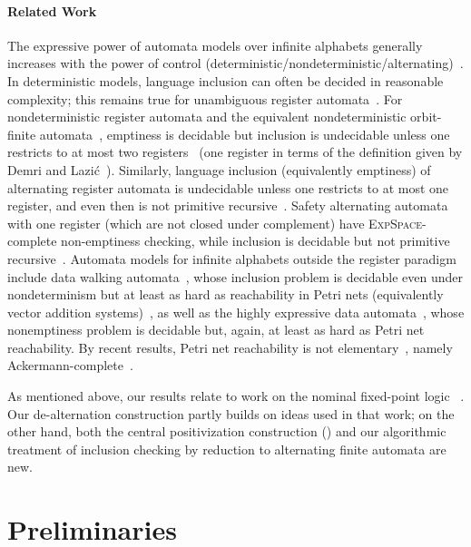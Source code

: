 \documentclass[10pt,a4paper]{amsart}
\theoremstyle{definition}
\renewcommand{\textsf}[1]{{\oldtextsf{\small#1}}}
\newcommand{\muBar}{\mbox{\textsf{Bar-$\mu$TL}}\xspace}
\newcommand{\EXPSPACE}{\textsc{ExpSpace}\xspace}
\begin{document}
\paragraph*{Related Work}%
The expressive power of automata models over infinite alphabets
generally increases with the power of control
(deterministic/nondeterministic/alternating)~\cite{KlinEA21}. In
deterministic models, language inclusion can often be decided in
reasonable complexity; this remains true for unambiguous register
automata~\cite{MottetQuaas19,Colcombet15,bfkm24}. For nondeterministic
register automata and the equivalent nondeterministic orbit-finite
automata~\cite{BojanczykEA14}, emptiness is decidable but inclusion is
undecidable unless one restricts to at most two
registers~\cite{KaminskiFrancez94} (one register in terms of the definition
given by Demri and Lazi{\'c}~\cite{DemriLazic09}). Similarly, language inclusion
(equivalently emptiness) of alternating register automata is
undecidable unless one restricts to at most one register, and even
then is not primitive recursive~\cite{DemriLazic09}. Safety
alternating automata with one register (which are not closed under
complement) have \EXPSPACE-complete non-emptiness checking,
while inclusion is decidable but not primitive
recursive~\cite{Lazic11}. Automata models for infinite alphabets outside
the register paradigm include data walking automata~\cite{ManuelEA16},
whose inclusion problem is decidable even under nondeterminism but at
least as hard as reachability in Petri nets (equivalently vector
addition systems)~\cite{ColcombetManuel15}, as well as the highly
expressive data automata~\cite{BojanczykEA11}, whose nonemptiness
problem is decidable but, again, at least as hard as Petri net
reachability. By recent results, Petri net reachability is
not elementary~\cite{CzerwinskiEA21}, namely
Ackermann-complete~\cite{LerouxSchmitz19,Leroux22,CzerwinskiOrlikowski22}.

As mentioned above, our results relate to work on the
nominal fixed-point logic \muBar~\cite{hms21}. Our de-alternation
construction partly builds on ideas used in that work; on the other
hand, both the central positivization construction
() and our algorithmic treatment of inclusion
checking by reduction to alternating finite automata are new. %

\section{Preliminaries}\label{sec:prelims}
\end{document}
